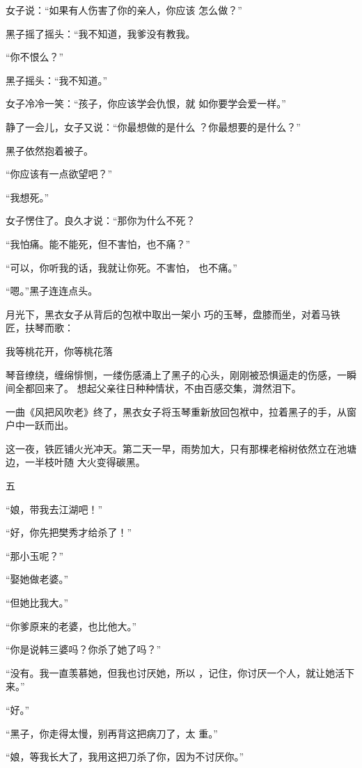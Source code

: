 \documentclass{article}
\begin{document}
女子说：“如果有人伤害了你的亲人，你应该
怎么做？” 

黑子摇了摇头：“我不知道，我爹没有教我。


“你不恨么？” 


黑子摇头：“我不知道。” 

女子冷冷一笑：“孩子，你应该学会仇恨，就
如你要学会爱一样。” 

静了一会儿，女子又说：“你最想做的是什么
？你最想要的是什么？” 


黑子依然抱着被子。 


“你应该有一点欲望吧？” 

\newpage


“我想死。” 

女子愣住了。良久才说：“那你为什么不死？

“我怕痛。能不能死，但不害怕，也不痛？”

“可以，你听我的话，我就让你死。不害怕，
也不痛。” 


“嗯。”黑子连连点头。 

月光下，黑衣女子从背后的包袱中取出一架小
巧的玉琴，盘膝而坐，对着马铁匠，扶琴而歌： 


我等桃花开，你等桃花落 




琴音缭绕，缠绵悱恻，一缕伤感涌上了黑子的心头，刚刚被恐惧逼走的伤感，一瞬间全都回来了。
\newpage
想起父亲往日种种情状，不由百感交集，潸然泪下。

一曲《风把风吹老》终了，黑衣女子将玉琴重新放回包袱中，拉着黑子的手，从窗户中一跃而出。

这一夜，铁匠铺火光冲天。第二天一早，雨势加大，只有那棵老榕树依然立在池塘边，一半枝叶随
大火变得碳黑。 


五 


“娘，带我去江湖吧！” 


“好，你先把樊秀才给杀了！” 


“那小玉呢？” 


“娶她做老婆。” 


“但她比我大。” 

\newpage


“你爹原来的老婆，也比他大。” 


“你是说韩三婆吗？你杀了她了吗？” 

“没有。我一直羡慕她，但我也讨厌她，所以
，记住，你讨厌一个人，就让她活下来。” 


“好。” 

“黑子，你走得太慢，别再背这把病刀了，太
重。” 

“娘，等我长大了，我用这把刀杀了你，因为不讨厌你。”
\end{document}
